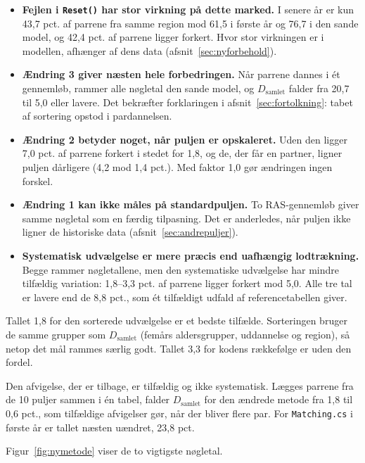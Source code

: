 \documentclass[11pt,a4paper]{article}
\newcommand{\kode}[1]{\texttt{#1}}
\begin{document}
\begin{itemize}
\item \textbf{Fejlen i \kode{Reset()} har stor virkning på dette marked.} I senere år er kun 43,7
pct. af parrene fra samme region mod 61,5 i første år og 76,7 i den sande model, og 42,4 pct. af
parrene ligger forkert. Hvor stor virkningen er i modellen, afhænger af dens data
(afsnit~\ref{sec:nyforbehold}).
\item \textbf{Ændring 3 giver næsten hele forbedringen.} Når parrene dannes i ét gennemløb, rammer
alle nøgletal den sande model, og $D_{\text{samlet}}$ falder fra 20,7 til 5,0 eller lavere. Det
bekræfter forklaringen i afsnit~\ref{sec:fortolkning}: tabet af sortering opstod i pardannelsen.
\item \textbf{Ændring 2 betyder noget, når puljen er opskaleret.} Uden den ligger 7,0 pct. af
parrene forkert i stedet for 1,8, og de, der får en partner, ligner puljen dårligere (4,2 mod
1,4 pct.). Med faktor 1,0 gør ændringen ingen forskel.
\item \textbf{Ændring 1 kan ikke måles på standardpuljen.} To RAS-gennemløb giver samme nøgletal som
en færdig tilpasning. Det er anderledes, når puljen ikke ligner de historiske data
(afsnit~\ref{sec:andrepuljer}).
\item \textbf{Systematisk udvælgelse er mere præcis end uafhængig lodtrækning.} Begge rammer
nøgletallene, men den systematiske udvælgelse har mindre tilfældig variation: 1,8--3,3 pct. af
parrene ligger forkert mod 5,0. Alle tre tal er lavere end de 8,8 pct., som ét tilfældigt udfald af
referencetabellen giver.
\end{itemize}

Tallet 1,8 for den sorterede udvælgelse er et bedste tilfælde. Sorteringen bruger de samme grupper
som $D_{\text{samlet}}$ (femårs aldersgrupper, uddannelse og region), så netop det mål rammes
særlig godt. Tallet 3,3 for kodens rækkefølge er uden den fordel.

Den afvigelse, der er tilbage, er tilfældig og ikke systematisk. Lægges parrene fra de 10 puljer
sammen i én tabel, falder $D_{\text{samlet}}$ for den ændrede metode fra 1,8 til 0,6 pct., som
tilfældige afvigelser gør, når der bliver flere par. For \kode{Matching.cs} i første år er tallet
næsten uændret, 23,8 pct.

Figur~\ref{fig:nymetode} viser de to vigtigste nøgletal.
\end{document}
